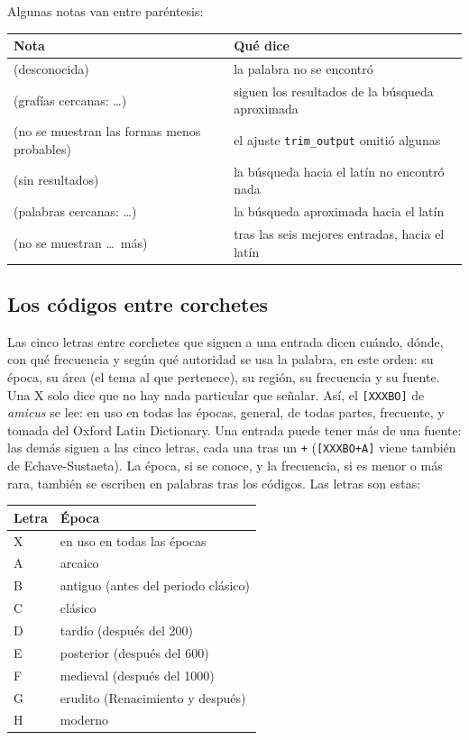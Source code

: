 \documentclass[12pt,
              article,
              oneside
              ]{memoir}
\begin{document}
\noindent{}%
Algunas notas van entre paréntesis:

\begin{longtable}{@{}>{\raggedright}p{}p{}@{}}
\toprule
Nota & Qué dice\\
\midrule
\endhead
(desconocida) & la palabra no se encontró\\
(grafías cercanas: \ldots) & siguen los resultados de la búsqueda aproximada\\
(no se muestran las formas menos probables) & el ajuste \texttt{trim\_output} omitió algunas\\
(sin resultados) & la búsqueda hacia el latín no encontró nada\\
(palabras cercanas: \ldots) & la búsqueda aproximada hacia el latín\\
(no se muestran \ldots\ más) & tras las seis mejores entradas, hacia el latín\\
\bottomrule
\end{longtable}

\subsection{Los códigos entre corchetes}
\label{sec:codes}

%
Las cinco letras entre corchetes que siguen a una entrada dicen cuándo,
dónde, con qué frecuencia y según qué autoridad se usa la palabra, en este
orden: su época, su área (el tema al que pertenece), su región, su
frecuencia y su fuente. Una X solo dice que no hay nada particular que
señalar. Así, el \texttt{[XXXBO]} de \textit{amicus} se lee: en uso en
todas las épocas, general, de todas partes, frecuente, y tomada del Oxford
Latin Dictionary. Una entrada puede tener más de una fuente: las demás
siguen a las cinco letras, cada una tras un \texttt{+}
(\texttt{[XXXBO+A]} viene también de Echave-Sustaeta). La época, si se
conoce, y la frecuencia, si es menor o más rara, también se escriben en
palabras tras los códigos. Las letras son estas:

\begin{longtable}{@{}lp{}@{}}
\toprule
Letra & Época\\
\midrule
\endhead
X & en uso en todas las épocas\\
A & arcaico\\
B & antiguo (antes del periodo clásico)\\
C & clásico\\
D & tardío (después del 200)\\
E & posterior (después del 600)\\
F & medieval (después del 1000)\\
G & erudito (Renacimiento y después)\\
H & moderno\\
\bottomrule
\end{longtable}
\end{document}
